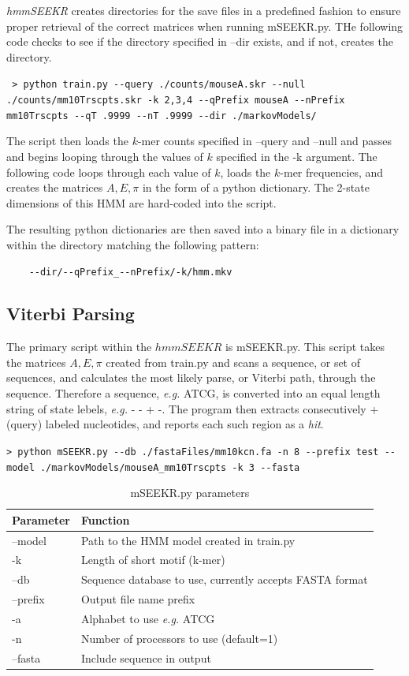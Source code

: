 \emph{hmmSEEKR} creates directories for the save files in a predefined fashion to ensure proper retrieval of the correct matrices when running mSEEKR.py. THe following code checks to see if the directory specified in --dir exists, and if not, creates the directory. 

\lstinline{
> python train.py --query ./counts/mouseA.skr --null ./counts/mm10Trscpts.skr -k 2,3,4 --qPrefix mouseA --nPrefix mm10Trscpts --qT .9999 --nT .9999 --dir ./markovModels/}


The script then loads the $k$-mer counts specified in --query and --null and passes and begins looping through the values of $k$ specified in the -k argument. The following code loops through each value of $k$, loads the $k$-mer frequencies, and creates the matrices $A,E,\pi$ in the form of a python dictionary. The 2-state dimensions of this HMM are hard-coded into the script. 


The resulting python dictionaries are then saved into a binary file in a dictionary within the directory matching the following pattern:

\begin{verbatim}
    --dir/--qPrefix_--nPrefix/-k/hmm.mkv
\end{verbatim}
\subsection{Viterbi Parsing}
The primary script within the $hmmSEEKR$ is mSEEKR.py. This script takes the matrices $A,E,\pi$ created from train.py and scans a sequence, or set of sequences, and calculates the most likely parse, or Viterbi path, through the sequence. Therefore a sequence, \emph{e.g.} ATCG, is converted into an equal length string of state lebels, \emph{e.g.} - - + -. The program then extracts consecutively + (query) labeled nucleotides, and reports each such region as a \emph{hit}. 

\lstinline{> python mSEEKR.py --db ./fastaFiles/mm10kcn.fa -n 8 --prefix test --model ./markovModels/mouseA_mm10Trscpts -k 3 --fasta}

\begin{table}[h]
\centering
 \begin{tabular}{|l l|}
 \hline
 Parameter & Function\\
 \hline
 --model & Path to the HMM model created in train.py \\
 -k & Length of short motif (k-mer) \\
 --db & Sequence database to use, currently accepts FASTA format\\
 --prefix & Output file name prefix \\
 -a & Alphabet to use \emph{e.g.} ATCG \\
 -n & Number of processors to use (default=1)\\
 --fasta & Include sequence in output \\
 \hline
 
\end{tabular}
\caption{mSEEKR.py parameters}
\label{tab:viterbiparams}
\end{table}

